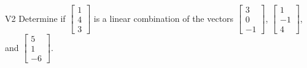 \documentclass{sbgLAquiz}
\begin{document}
\begin{problem}{V2} Determine if $\begin{bmatrix} 1 \\ 4 \\ 3 \end{bmatrix}$ is a linear combination of the vectors $\begin{bmatrix} 3 \\ 0 \\ -1 \end{bmatrix}$, $\begin{bmatrix} 1 \\ -1 \\ 4 \end{bmatrix}$, and $\begin{bmatrix} 5 \\ 1 \\  -6 \end{bmatrix}$.
\end{problem}
\end{document}
